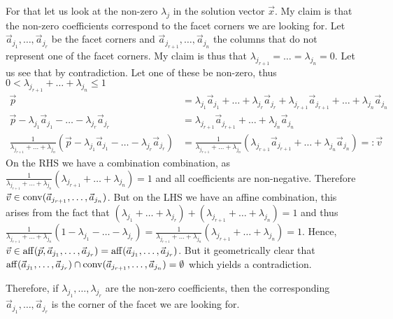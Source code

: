 For that let us look at the non-zero $\lambda_j$ in the solution vector $\vec x$. My claim is that the non-zero coefficients correspond to the facet corners we are looking for. Let $\vec a_{j_1}, \dots, \vec a_{j_r}$ be the facet corners and $\vec a_{j_{r+1}}, \dots, \vec a_{j_n}$ the columns that do not represent one of the facet corners. My claim is thus that $\lambda_{j_{r+1}} = \dots = \lambda_{j_n} = 0$. Let us see that by contradiction. Let one of these be non-zero, thus $0 < \lambda_{j_{r+1}} + \dots + \lambda_{j_n} \leq 1$
\begin{align*}
    \vec p &= \lambda_{j_1}\vec a_{j_1} + \dots + \lambda_{j_r}\vec a_{j_r} + \lambda_{j_{r+1}}\vec a_{j_{r+1}} + \dots + \lambda_{j_n}\vec a_{j_n}\\
    \vec p  - \lambda_{j_1}\vec a_{j_1} - \dots - \lambda_{j_r}\vec a_{j_r} &= \lambda_{j_{r+1}}\vec a_{j_{r+1}} + \dots + \lambda_{j_n}\vec a_{j_n}\\
    \frac{1}{\lambda_{j_{r+1}} + \dots + \lambda_{j_n}}(\vec p  - \lambda_{j_1}\vec a_{j_1} - \dots - \lambda_{j_r}\vec a_{j_r}) &= \frac{1}{\lambda_{j_{r+1}} + \dots + \lambda_{j_n}}(\lambda_{j_{r+1}}\vec a_{j_{r+1}} + \dots + \lambda_{j_n}\vec a_{j_n}) =: \vec v
\end{align*}
On the RHS we have a combination combination, as $\frac{1}{\lambda_{j_{r+1}} + \dots + \lambda_{j_n}}(\lambda_{j_{r+1}} + \dots + \lambda_{j_n}) = 1$ and all coefficients are non-negative. Therefore $\vec v \in \operatorname{conv}(\vec a_{j_{r+1}}, \dots, \vec a_{j_n})$. But on the LHS we have an affine combination, this arises from the fact that $(\lambda_{j_1} + \dots + \lambda_{j_r}) + (\lambda_{j_{r+1}} + \dots + \lambda_{j_n}) = 1$ and thus $\frac{1}{\lambda_{j_{r+1}} + \dots + \lambda_{j_n}}(1 - \lambda_{j_1} - \dots - \lambda_{j_r}) = \frac{1}{\lambda_{j_{r+1}} + \dots + \lambda_{j_n}}(\lambda_{j_{r+1}} + \dots + \lambda_{j_n}) = 1$. Hence, $\vec v \in \operatorname{aff}(\vec p, \vec a_{j_1}, \dots, \vec a_{j_r}) = \operatorname{aff}(\vec a_{j_1}, \dots, \vec a_{j_r})$. But it geometrically clear that $\operatorname{aff}(\vec a_{j_1}, \dots, \vec a_{j_r}) \cap \operatorname{conv}(\vec a_{j_{r+1}}, \dots, \vec a_{j_n}) = \emptyset$ which yields a contradiction.

Therefore, if $\lambda_{j_1}, \dots, \lambda_{j_r}$ are the non-zero coefficients, then the corresponding $\vec a_{j_1}, \dots, \vec a_{j_r}$ is the corner of the facet we are looking for.

